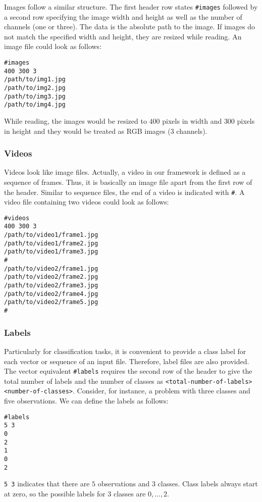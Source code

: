 Images follow a similar structure. The first header row states \texttt{\#images} followed by a second row specifying the image width and height as well as the number of channels (one or three). The data is the absolute path to the image. If images do not match the specified width and height, they are resized while reading. An image file could look as follows:
\begin{verbatim}
#images
400 300 3
/path/to/img1.jpg
/path/to/img2.jpg
/path/to/img3.jpg
/path/to/img4.jpg
\end{verbatim}
While reading, the images would be resized to $ 400 $ pixels in width and $ 300 $ pixels in height and they would be treated as RGB images ($ 3 $ channels).

\subsubsection*{Videos}

Videos look like image files. Actually, a video in our framework is defined as a sequence of frames. Thus, it is basically an image file apart from the first row of the header. Similar to sequence files, the end of a video is indicated with \texttt{\#}. A video file containing two videos could look as follows:
\begin{verbatim}
#videos
400 300 3
/path/to/video1/frame1.jpg
/path/to/video1/frame2.jpg
/path/to/video1/frame3.jpg
#
/path/to/video2/frame1.jpg
/path/to/video2/frame2.jpg
/path/to/video2/frame3.jpg
/path/to/video2/frame4.jpg
/path/to/video2/frame5.jpg
#
\end{verbatim}

\subsubsection*{Labels}

Particularly for classification tasks, it is convenient to provide a class label for each vector or sequence of an input file. Therefore, label files are also provided. The vector equivalent \texttt{\#labels} requires the second row of the header to give the total number of labels and the number of classes as \texttt{<total-number-of-labels> <number-of-classes>}. Consider, for instance, a problem with three classes and five observations. We can define the labels as follows:
\begin{verbatim}
#labels
5 3
0
2
1
0
2
\end{verbatim}
\texttt{5 3} indicates that there are $ 5 $ observations and $ 3 $ classes. Class labels always start at zero, so the possible labels for $ 3 $ classes are $ 0, \dots, 2 $.

